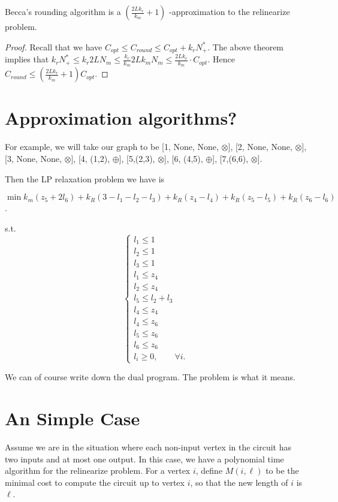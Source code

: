 \documentclass[11pt]{article} %
\theoremstyle{plain}
\theoremstyle{definition}
\begin{document}
\begin{corollary}
Becca's rounding algorithm is a $(\frac{2Lk_r}{k_m} +1)$ -approximation to the relinearize problem. 
\end{corollary}
\begin{proof}
Recall that we have $C_{opt} \leq C_{round}  \leq C_{opt} + k_r N_+^*$. The above theorem implies 
that $k_r N_+^*  \leq k_r 2L N_m \leq \frac{k_r}{k_m} 2L k_m N_m \leq \frac{2Lk_r}{k_m}  \cdot C_{opt}$. Hence $C_{round } \leq  (\frac{2Lk_r}{k_m} +1) C_{opt}$.
\end{proof}

\section{Approximation algorithms?}

For example, we will take our graph to be 
[1, None, None, $\otimes$], [2, None, None, $\otimes$], [3, None, None, $\otimes$], [4, (1,2), $\oplus$], [5,(2,3), $\otimes$], [6, (4,5), $\oplus$], [7,(6,6), $\otimes$]. 

Then the LP relaxation problem we have is 

$\min k_m (z_5 + 2l_6)  + k_R(3 - l_1 - l_2 - l_3) + k_R(z_4 - l_4) + k_R(z_5 - l_5) + k_R(z_6 - l_6)$. 

s.t. 
\[
\begin{cases}
l_1 \leq 1 \\
l_2 \leq 1 \\
l_3 \leq 1 \\ 
l_1 \leq z_4 \\
l_2 \leq z_4 \\ 
l_5 \leq l_2 + l_3 \\
l_4 \leq z_4 \\
l_4 \leq z_6 \\
l_5 \leq z_6 \\
l_6 \leq z_6 \\
l_i \geq 0, \qquad \forall i. 
\end{cases}
\]

We can of course write down the dual program. The problem is what it means. 
\fi

\section{An Simple Case}
Assume we are in the situation where each non-input vertex in the circuit has two inputs and at most one output. 
In this case, we have a polynomial time algorithm for the relinearize problem. For a vertex $i$, define $M(i,\ell)$ to be the minimal cost to compute the circuit up to vertex $i$, so that the new length of $i$ is $\ell$.
\end{document}
